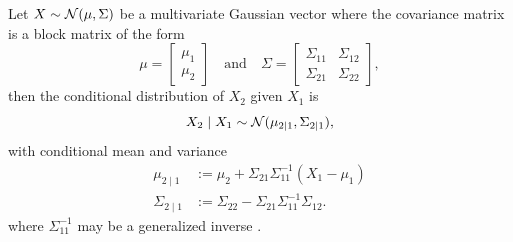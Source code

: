 \begin{theorem}
    \label{thm: conditional gaussian distribution}
    Let \(X\sim\mathcal{N}(\mu,\Sigma)\) be a multivariate Gaussian vector where
    the covariance matrix is a block matrix of the form
    \[
        \mu = \begin{bmatrix}
            \mu_1\\ \mu_2
        \end{bmatrix}
        \quad \text{and} \quad
        \Sigma = \begin{bmatrix}
            \Sigma_{11} & \Sigma_{12}
            \\
            \Sigma_{21} & \Sigma_{22}
        \end{bmatrix},
    \]
    then the conditional distribution of \(X_2\) given \(X_1\) is
    \[
        X_2\mid X_1 \sim \mathcal{N}(\mu_{2\mid 1}, \Sigma_{2\mid 1}),
    \]
    with conditional mean and variance
    \begin{align*}
        \mu_{2\mid 1} &:= \mu_2 + \Sigma_{21}\Sigma_{11}^{-1}(X_1-\mu_1)
        \\
        \Sigma_{2\mid 1} &:= \Sigma_{22} -  \Sigma_{21}\Sigma_{11}^{-1}\Sigma_{12}.
    \end{align*}
    where \(\Sigma_{11}^{-1}\) may be a generalized inverse
    \citep[cf.][]{eatonMultivariateStatisticsVector2007}.
\end{theorem}
